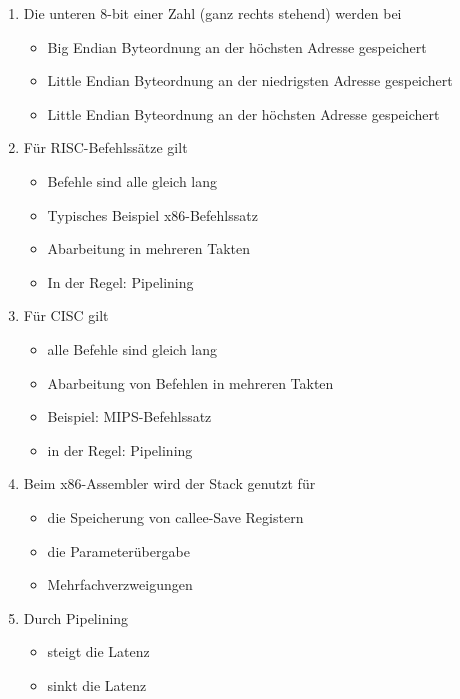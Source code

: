 \documentclass{exercisesheet}
\begin{document}
\begin{enumerate}
\begin{itemize}
        \end{itemize}
      \item Die unteren 8-bit einer Zahl (ganz rechts stehend) werden bei
        \begin{itemize}
          \item Big Endian Byteordnung an der höchsten Adresse gespeichert \checkmark
          \item Little Endian Byteordnung an der niedrigsten Adresse gespeichert \checkmark
          \item Little Endian Byteordnung an der höchsten Adresse gespeichert
        \end{itemize}
      \item Für RISC-Befehlssätze gilt
        \begin{itemize}
          \item Befehle sind alle gleich lang \checkmark
          \item Typisches Beispiel x86-Befehlssatz
          \item Abarbeitung in mehreren Takten \checkmark
          \item In der Regel: Pipelining \checkmark
        \end{itemize}
      \item Für CISC gilt
        \begin{itemize}
          \item alle Befehle sind gleich lang
          \item Abarbeitung von Befehlen in mehreren Takten \checkmark
          \item Beispiel: MIPS-Befehlssatz
          \item in der Regel: Pipelining
        \end{itemize}
      \item Beim x86-Assembler wird der Stack genutzt für
        \begin{itemize}
          \item die Speicherung von callee-Save Registern \checkmark
          \item die Parameterübergabe \checkmark
          \item Mehrfachverzweigungen
        \end{itemize}
      \item Durch Pipelining
        \begin{itemize}
          \item steigt die Latenz \checkmark
          \item sinkt die Latenz

\end{itemize}
\end{enumerate}
\end{document}
